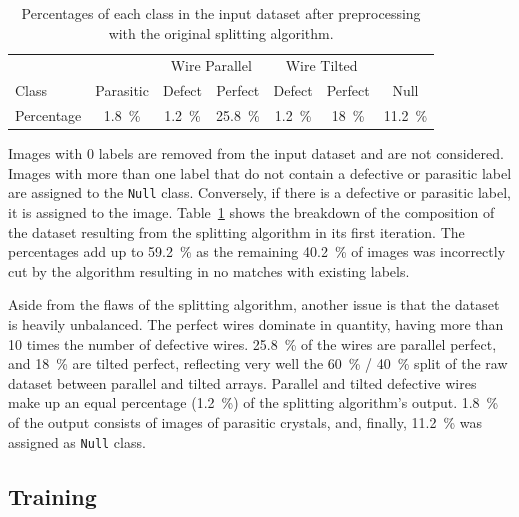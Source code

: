 \begin{table}
    \centering
    \caption[Percentages of each class in the input dataset after preprocessing with the original splitting algorithm.]{Percentages of each class in the input dataset after preprocessing with the original splitting algorithm.}
    \begin{tabular}{l|c|c c|c c|c}
        & & \multicolumn{2}{c|}{Wire Parallel} & \multicolumn{2}{c|}{Wire Tilted} & \\ 
        Class & Parasitic & Defect & Perfect & Defect & Perfect & Null \\ \hline \hline
        Percentage & \qty{1.8}{\%} & \qty{1.2}{\%} & \qty{25.8}{\%} & \qty{1.2}{\%} &\qty{18}{\%} & \qty{11.2}{\%}
    \end{tabular}
    \label{tab:class_makeup}
\end{table}

Images with \num{0} labels are removed from the input dataset and are not considered. Images with more than one label that do not contain a defective or parasitic label are assigned to the \texttt{Null} class. Conversely, if there is a defective or parasitic label, it is assigned to the image. Table~\ref{tab:class_makeup} shows the breakdown of the composition of the dataset resulting from the splitting algorithm in its first iteration. The percentages add up to \qty{59.2}{\%} as the remaining \qty{40.2}{\%} of images was incorrectly cut by the algorithm resulting in no matches with existing labels.

Aside from the flaws of the splitting algorithm, another issue is that the dataset is heavily unbalanced. The perfect wires dominate in quantity, having more than \num{10} times the number of defective wires. \qty{25.8}{\%} of the wires are parallel perfect, and \qty{18}{\%} are tilted perfect, reflecting very well the \qty{60}{\%} / \qty{40}{\%} split of the raw dataset between parallel and tilted arrays. Parallel and tilted defective wires make up an equal percentage (\qty{1.2}{\%}) of the splitting algorithm's output. \qty{1.8}{\%} of the output consists of images of parasitic crystals, and, finally, \qty{11.2}{\%} was assigned as \texttt{Null} class.

\subsection{Training}

